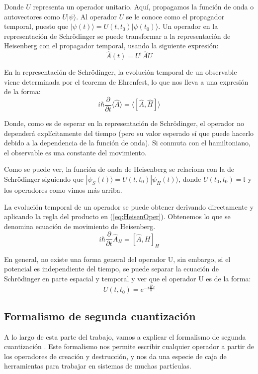 \documentclass[12pt,twoside]{article}
\begin{document}
Donde $U$ representa un operador unitario. Aquí, propagamos la función de onda o autovectores como $U|\psi\rangle$. Al operador $U$ se le conoce como  el propagador temporal, puesto que $|\psi(t)\rangle=U(t, t_0)|\psi(t_0)\rangle$. Un operador en la representación de Schrödinger se puede transformar a la representación de Heisenberg con el propagador temporal, usando la siguiente expresión:
\begin{equation}
\hat{A}(t) =U^{\dagger}\hat{A}U
\label{eq:HeisenOper}
\end{equation}

En la representación de Schrödinger, la evolución temporal de un observable viene determinada por el teorema de Ehrenfest, lo que nos lleva a una expresión de la forma:
$$
i\hbar\frac{\partial}{\partial t}\langle\hat{A}\rangle=\langle[\hat{A}, \hat{H}]\rangle
$$

Donde, como es de esperar en la representación de Schrödinger, el operador no dependerá explícitamente del tiempo (pero su valor esperado sí que puede hacerlo debido a la dependencia de la función de onda). Si conmuta con el hamiltoniano, el observable es una constante del movimiento.

Como se puede ver, la función de onda de Heisenberg se relaciona con la de Schrödinger siguiendo que $|\psi_S(t)\rangle=U(t, t_0)|\psi_H(t)\rangle$, donde $U(t_0, t_0) = \mathbb{I}$ y los operadores como vimos más arriba.

La evolución temporal de un operador se puede obtener derivando directamente y aplicando la regla del producto en (\ref{eq:HeisenOper}). Obtenemos lo que se denomina ecuación de movimiento de Heisenberg.
\begin{equation}
i\hbar\frac{\partial}{\partial t}\hat{A}_H=[\hat{A}, H]_H
\end{equation}

En general, no existe una forma general del operador U, sin embargo, si el potencial es independiente del tiempo, se puede separar la ecuación de Schrödinger en parte espacial y temporal y ver que el operador U es de la forma:
$$
U(t, t_0) = e^{-i\frac{\hat{H}}{\hbar}t}
$$
\subsection{Formalismo de segunda cuantización}
\label{sec:secondQuantized}

A lo largo de esta parte del trabajo, vamos a explicar el formalismo de segunda cuantización \cite{LibroQuantum}. Este formalismo nos permite escribir cualquier operador a partir de los operadores de creación y destrucción, y nos da una especie de caja de herramientas para trabajar en sistemas de muchas partículas.
\end{document}

